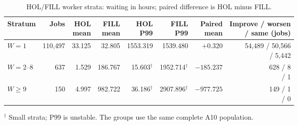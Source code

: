 \begin{table}[H]\centering
\caption{HOL/FILL worker strata: waiting in hours; paired difference is HOL minus FILL.}
\label{tab:r2strata}
\begin{tabular}{lrrrrrrr}
\toprule
Stratum & Jobs & \shortstack{HOL\\mean} & \shortstack{FILL\\mean} & \shortstack{HOL\\P99} & \shortstack{FILL\\P99} & \shortstack{Paired\\mean} & \shortstack{Improve / worsen\\/ same (jobs)}\\
\midrule
$W=1$ & 110,497 & 33.125 & 32.805 & 1553.319 & 1539.480 & $+0.320$ & \shortstack{54,489 / 50,566\\ / 5,442}\\
$W=2$--8 & 637 & 1.529 & 186.767 & 15.603$^\dagger$ & 1952.714$^\dagger$ & $-185.237$ & \shortstack{628 / 8\\ / 1}\\
$W\ge9$ & 150 & 4.997 & 982.722 & 36.186$^\dagger$ & 2907.896$^\dagger$ & $-977.725$ & \shortstack{149 / 1\\ / 0}\\
\bottomrule
\end{tabular}
\smallskip\par $^\dagger$ Small strata; P99 is unstable. The groups use the same complete A10 population.
\end{table}
